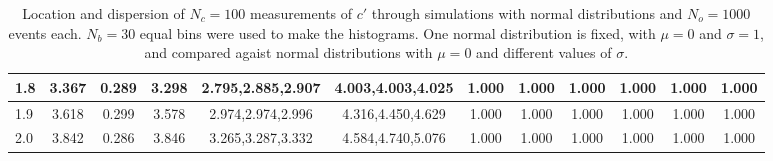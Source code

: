 \begin{table*}[h!]
\begin{center}
\begin{tabular}{| l | c | c | c | c | c | c | c | c | c | c | c |}
1.8 & 3.367 & 0.289 & 3.298 & 2.795,2.885,2.907 & 4.003,4.003,4.025  & 1.000  & 1.000  & 1.000  & 1.000  & 1.000  & 1.000 \\\hline
1.9 & 3.618 & 0.299 & 3.578 & 2.974,2.974,2.996 & 4.316,4.450,4.629  & 1.000  & 1.000  & 1.000  & 1.000  & 1.000  & 1.000 \\\hline
2.0 & 3.842 & 0.286 & 3.846 & 3.265,3.287,3.332 & 4.584,4.740,5.076  & 1.000  & 1.000  & 1.000  & 1.000  & 1.000  & 1.000 \\\hline
\end{tabular}
\caption{Location and dispersion of $N_c=100$
measurements of $c'$ through simulations
with normal distributions and $N_o=1000$ events each.
$N_b=30$ equal bins were used to make the histograms.
One normal distribution is fixed, with $\mu=0$ and $\sigma=1$,
and compared agaist normal distributions with $\mu=0$
and different values of $\sigma$.}
\end{center}
\end{table*}